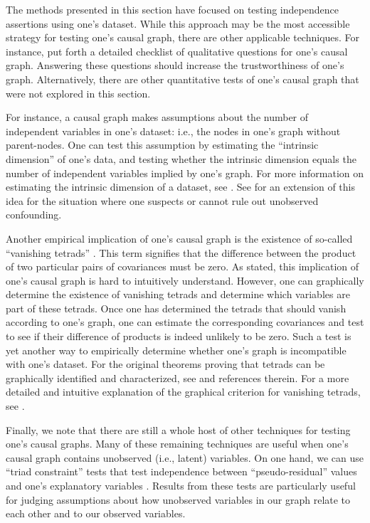 The methods presented in this section have focused on testing independence assertions using one's dataset.
While this approach may be the most accessible strategy for testing one's causal graph, there are other applicable techniques.
For instance, \citet{pitchforth_2013_proposed} put forth a detailed checklist of qualitative questions for one's causal graph.
Answering these questions should increase the trustworthiness of one's graph.
Alternatively, there are other quantitative tests of one's causal graph that were not explored in this section.

For instance, a causal graph makes assumptions about the number of independent variables in one's dataset: i.e., the nodes in one's graph without parent-nodes.
One can test this assumption by estimating the ``intrinsic dimension'' of one's data, and testing whether the intrinsic dimension equals the number of independent variables implied by one's graph.
For more information on estimating the intrinsic dimension of a dataset, see \citet{camastra_2016_intrinsic, song_2019_identification}.
See \citet{chenwei_2019_likelihood} for an extension of this idea for the situation where one suspects or cannot rule out unobserved confounding.

Another empirical implication of one's causal graph is the existence of so-called ``vanishing tetrads'' \citep{spearman_1904_general}.
This term signifies that the difference between the product of two particular pairs of covariances must be zero.
As stated, this implication of one's causal graph is hard to intuitively understand.
However, one can graphically determine the existence of vanishing tetrads and determine which variables are part of these tetrads.
Once one has determined the tetrads that should vanish according to one's graph, one can estimate the corresponding covariances and test to see if their difference of products is indeed unlikely to be zero.
Such a test is yet another way to empirically determine whether one's graph is incompatible with one's dataset.
For the original theorems proving that tetrads can be graphically identified and characterized, see \citet{shafer_1996_vanishing} and references therein.
For a more detailed and intuitive explanation of the graphical criterion for vanishing tetrads, see \citet{thoemmes_2018_local}.

Finally, we note that there are still a whole host of other techniques for testing one's causal graphs.
Many of these remaining techniques are useful when one's causal graph contains unobserved (i.e., latent) variables.
On one hand, we can use ``triad constraint'' tests that test independence between ``pseudo-residual'' values and one's explanatory variables \citep{cai_2019_triad}.
Results from these tests are particularly useful for judging assumptions about how unobserved variables in our graph relate to each other and to our observed variables.

